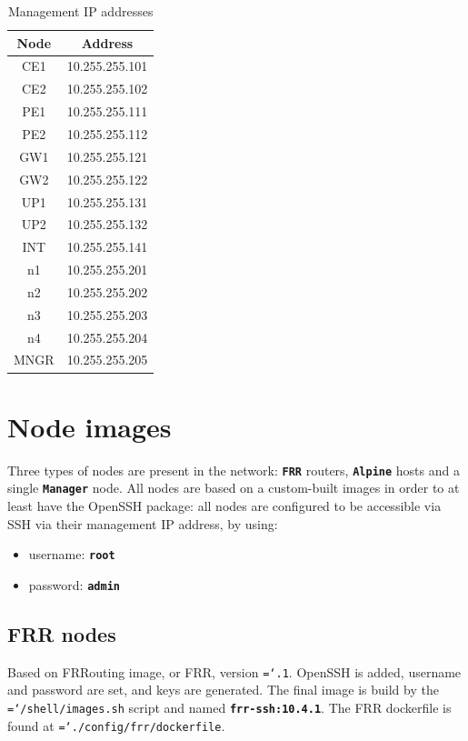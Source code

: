 \documentclass{report}
\newcommand{\monospaced}[1]{\texttt{\hyphenchar\font=`\-#1}}
\newcommand{\monobold}[1]{\texttt{\textbf{#1}}}
\begin{document}
\begin{table}[H]
\begin{center}
\begin{tabular}{|c c|} 
 \hline
 Node & Address \\ [0.5ex] 
 \hline \hline
 CE1 & 10.255.255.101 \\
 CE2 & 10.255.255.102 \\\hline
 PE1 & 10.255.255.111 \\
 PE2 & 10.255.255.112 \\ 
 GW1 & 10.255.255.121 \\
 GW2 & 10.255.255.122 \\\hline
 UP1 & 10.255.255.131 \\
 UP2 & 10.255.255.132 \\
 INT & 10.255.255.141 \\\hline\hline
 n1 & 10.255.255.201 \\
 n2 & 10.255.255.202 \\
 n3 & 10.255.255.203 \\
 n4 & 10.255.255.204 \\
 MNGR & 10.255.255.205 \\\hline
\end{tabular}
\label{tab:mgmt}
\caption{Management IP addresses}
\end{center}
\end{table}

\section{Node images}
Three types of nodes are present in the network: \monobold{FRR} routers, \monobold{Alpine} hosts and a single \monobold{Manager} node. All nodes are based on a custom-built images in order to at least have the OpenSSH package: all nodes are configured to be accessible via SSH via their management IP address, by using:
\begin{itemize}
    \item username: \monobold{root}
    \item password: \monobold{admin}
\end{itemize}
\subsection{FRR nodes}\label{sec:img_frr}
Based on FRRouting image, or FRR, version \monospaced{10.4.1}. OpenSSH is added, username and password are set, and keys are generated. The final image is build by the \monospaced{/shell/images.sh} script and named \monobold{frr-ssh:10.4.1}. \newline The FRR dockerfile is found at \monospaced{./config/frr/dockerfile}.
\end{document}
